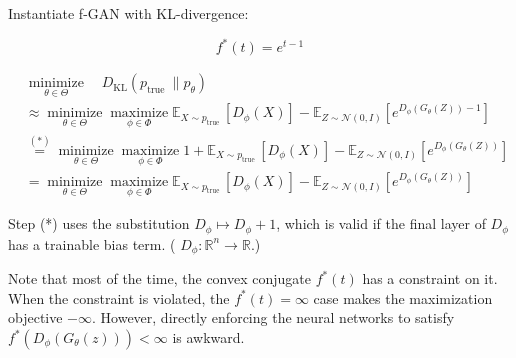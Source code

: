 \begin{concept}
    Instantiate f-GAN with KL-divergence: 

    $$
    f^{*}(t)=e^{t-1}
    $$

    $$
    \begin{aligned}
    & \underset{\theta \in \Theta}{\operatorname{minimize}} \quad D_{\mathrm{KL}}\left(p_{\text {true }} \| p_{\theta}\right) \\
    & \approx \underset{\theta \in \Theta}{\operatorname{minimize}} \underset{\phi \in \Phi}{\operatorname{maximize}} \mathbb{E}_{X \sim p_{\text {true }}}\left[D_{\phi}(X)\right]-\mathbb{E}_{Z \sim \mathcal{N}(0, I)}\left[e^{D_{\phi}\left(G_{\theta}(Z)\right)-1}\right] \\
    & \stackrel{(*)}{=} \underset{\theta \in \Theta}{\operatorname{minimize}} \underset{\phi \in \Phi}{\operatorname{maximize}} 1+\mathbb{E}_{X \sim p_{\text {true }}}\left[D_{\phi}(X)\right]-\mathbb{E}_{Z \sim \mathcal{N}(0, I)}\left[e^{D_{\phi}\left(G_{\theta}(Z)\right)}\right] \\
    & =\underset{\theta \in \Theta}{\operatorname{minimize}} \underset{\phi \in \Phi}{\operatorname{maximize}} \mathbb{E}_{X \sim p_{\text {true }}}\left[D_{\phi}(X)\right]-\mathbb{E}_{Z \sim \mathcal{N}(0, I)}\left[e^{D_{\phi}\left(G_{\theta}(Z)\right)}\right]
    \end{aligned}
    $$

    Step (*) uses the substitution $D_{\phi} \mapsto D_{\phi}+1$, which is valid if the final layer of $D_{\phi}$ has a trainable bias term. ( $D_{\phi}: \mathbb{R}^{n} \rightarrow \mathbb{R}$.)
\end{concept}

Note that most of the time, the convex conjugate $f^{*}(t)$ has a constraint on it.
When the constraint is violated, the $f^{*}(t)=\infty$ case makes the maximization objective $-\infty$.
However, directly enforcing the neural networks to satisfy $f^{*}(D_{\phi}\left(G_{\theta}(z)\right))<\infty$ is awkward.

